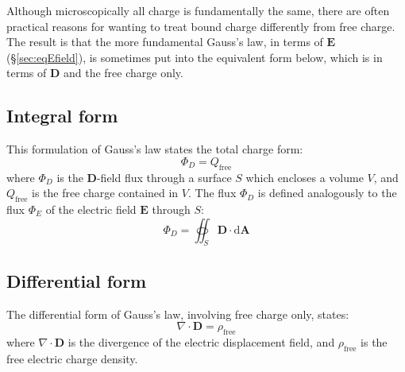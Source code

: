 \documentclass[a4paper]{article}
\begin{document}
Although microscopically all charge is fundamentally the same, there are often practical reasons for wanting to treat bound charge differently from free charge. The result is that the more fundamental Gauss's law, in terms of \(\mathbf{E}\) (\S\ref{sec:eqEfield}), is sometimes put into the equivalent form below, which is in terms of \(\mathbf{D}\) and the free charge only.

\subsection{Integral form}
This formulation of Gauss's law states the total charge form: 
\[
    \Phi_D = Q_\text{free}
\]
where \(\Phi_D\) is the \(\mathbf{D}\)-field flux through a surface \(S\) which encloses a volume \(V\), and \(Q_\text{free}\) is the free charge contained in \(V\). The flux \(\Phi_D\) is defined analogously to the flux \(\Phi_E\) of the electric field \(\mathbf{E}\) through \(S\): 
\[
    \Phi_D = \oiint_S \mathbf{D} \cdot \mathrm{d} \mathbf{A}
\]

\subsection{Differential form}
The differential form of Gauss's law, involving free charge only, states: 
\[
    \nabla \cdot \mathbf{D} = \rho_\text{free}
\]
where \(\nabla \cdot \mathbf{D}\) is the divergence of the electric displacement field, and \(\rho_\text{free}\) is the free electric charge density. 
\end{document}
